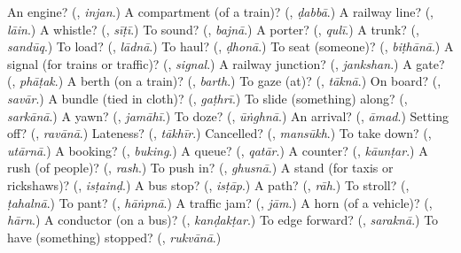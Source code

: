 \begin{tcolorbox}[breakable,colback=teal!4,colframe=teal!35!black,title={Before you move on}]
An engine? (\textbf{}, \emph{injan}.) A compartment (of a train)? (\textbf{}, \emph{ḍabbā}.) A railway line? (\textbf{}, \emph{lāin}.) A whistle? (\textbf{}, \emph{sīṭī}.) To sound? (\textbf{}, \emph{bajnā}.) A porter? (\textbf{}, \emph{qulī}.) A trunk? (\textbf{}, \emph{sandūq}.) To load? (\textbf{}, \emph{lādnā}.) To haul? (\textbf{}, \emph{ḍhonā}.) To seat (someone)? (\textbf{}, \emph{biṭhānā}.) A signal (for trains or traffic)? (\textbf{}, \emph{signal}.) A railway junction? (\textbf{}, \emph{jankshan}.) A gate? (\textbf{}, \emph{phāṭak}.) A berth (on a train)? (\textbf{}, \emph{barth}.) To gaze (at)? (\textbf{}, \emph{tāknā}.) On board? (\textbf{}, \emph{savār}.) A bundle (tied in cloth)? (\textbf{}, \emph{gaṭhrī}.) To slide (something) along? (\textbf{}, \emph{sarkānā}.) A yawn? (\textbf{}, \emph{jamāhī}.) To doze? (\textbf{}, \emph{ūṅghnā}.) An arrival? (\textbf{}, \emph{āmad}.) Setting off? (\textbf{}, \emph{ravānā}.) Lateness? (\textbf{}, \emph{tākhīr}.) Cancelled? (\textbf{}, \emph{mansūkh}.) To take down? (\textbf{}, \emph{utārnā}.) A booking? (\textbf{}, \emph{buking}.) A queue? (\textbf{}, \emph{qatār}.) A counter? (\textbf{}, \emph{kāunṭar}.) A rush (of people)? (\textbf{}, \emph{rash}.) To push in? (\textbf{}, \emph{ghusnā}.) A stand (for taxis or rickshaws)? (\textbf{}, \emph{isṭainḍ}.) A bus stop? (\textbf{}, \emph{isṭāp}.) A path? (\textbf{}, \emph{rāh}.) To stroll? (\textbf{}, \emph{ṭahalnā}.) To pant? (\textbf{}, \emph{hāṅpnā}.) A traffic jam? (\textbf{}, \emph{jām}.) A horn (of a vehicle)? (\textbf{}, \emph{hārn}.) A conductor (on a bus)? (\textbf{}, \emph{kanḍakṭar}.) To edge forward? (\textbf{}, \emph{saraknā}.) To have (something) stopped? (\textbf{}, \emph{rukvānā}.)
\end{tcolorbox}

